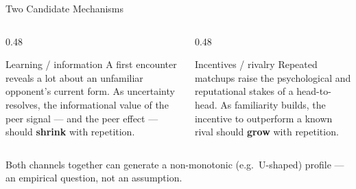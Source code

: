 \documentclass[11pt,aspectratio=169]{beamer}
\begin{document}
\begin{frame}{Two Candidate Mechanisms}
\small
\begin{columns}[T]
\begin{column}{0.48\textwidth}
\begin{block}{Learning / information}
A first encounter reveals a lot about an unfamiliar opponent's current form.
As uncertainty resolves, the informational value of the peer signal --- and
the peer effect --- should \textbf{shrink} with repetition.
\end{block}
\end{column}
\begin{column}{0.48\textwidth}
\begin{block}{Incentives / rivalry}
Repeated matchups raise the psychological and reputational stakes of a
head-to-head. As familiarity builds, the incentive to outperform a known
rival should \textbf{grow} with repetition.
\end{block}
\end{column}
\end{columns}

\vspace{0.5em}
\begin{center}

\small Both channels together can generate a non-monotonic (e.g.\ U-shaped)
profile --- an empirical question, not an assumption.
\end{center}
\end{frame}
\end{document}

